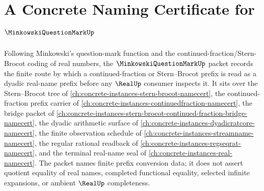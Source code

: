 \chapter{A Concrete Naming Certificate for $\MinkowskiQuestionMarkUp$}
\label{ch:concrete-instances-minkowski-question-mark-namecert}

Following Minkowski's question-mark function and the continued-fraction/Stern-Brocot coding of real numbers, the $\MinkowskiQuestionMarkUp$ packet records the finite route by which a continued-fraction or Stern--Brocot prefix is read as a dyadic real-name prefix before any $\RealUp$ consumer inspects it. It sits over the Stern--Brocot tree of \autoref{ch:concrete-instances-stern-brocot-namecert}, the continued-fraction prefix carrier of \autoref{ch:concrete-instances-continuedfraction-namecert}, the bridge packet of \autoref{ch:concrete-instances-stern-brocot-continued-fraction-bridge-namecert}, the dyadic arithmetic surface of \autoref{ch:concrete-instances-dyadicratcore-namecert}, the finite observation schedule of \autoref{ch:concrete-instances-streamname-namecert}, the regular rational readback of \autoref{ch:concrete-instances-regseqrat-namecert}, and the terminal real-name seal of \autoref{ch:concrete-instances-real-namecert}. The packet names finite prefix conversion data; it does not assert quotient equality of real names, completed functional equality, selected infinite expansions, or ambient $\RealUp$ completeness.

